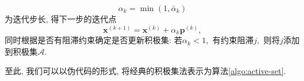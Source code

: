 \documentclass{SBCbookchapter}
\newcommand{\V}[1]{{\bm{#1}}}
\DeclareMathOperator*{\argmin}{arg\,min}
\newcommand{\R}{\mathcal{R}}
\numberwithin{equation}{section}
\begin{document}
\begin{equation}
\label{eq:qp-active-set-step-len-uniform}
\alpha_k = \min (1, \bar{\alpha}_k)
\end{equation}
为迭代步长, 得下一步的迭代点
\begin{equation}
\label{eq:qp-active-set-next-step-uniform}
\V{x}^{(k+1)} = \V{x}^{(k)} + \alpha_k \V{p}^{(k)},
\end{equation}
同时根据是否有阻滞约束确定是否更新积极集: 若$\alpha_k < 1,$ 有约束阻滞$j,$ 则将$j$添加到积极集$\mathcal{A}.$

至此, 我们可以以伪代码的形式, 将经典的积极集法表示为算法\ref{algo:active-set}.

\end{document}
